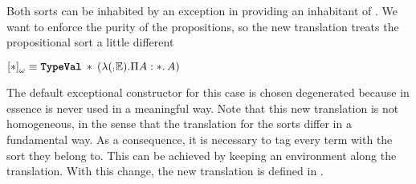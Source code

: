 Both sorts can be inhabited by an exception in \ETheory{} providing an inhabitant
of \ExceptionType{}. We want to enforce the purity of the propositions, so the new translation
\WTrans{\cdot}
treats the propositional sort a little different 
\begin{center}
$\WTrans<>{\Prop} \equiv \app{\TypeVal}{\Prop}{(\varabs{_}{\ExceptionType}{\depArrow{A}{\Prop}{A}})} $
\end{center}
The default exceptional constructor for this case is chosen degenerated because in essence is never used in a 
meaningful way. Note that this new translation is not homogeneous, in the sense that 
the translation for the sorts differ in a fundamental way. As a consequence, it is necessary to tag
every term with the sort they belong to. This can be achieved by keeping an environment along the
translation. With this change, the new translation is defined in 
.

